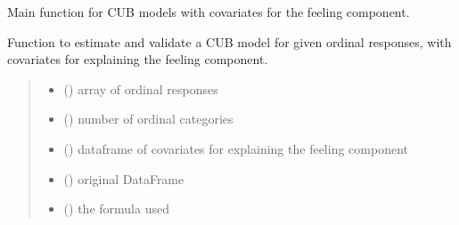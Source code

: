 \documentclass[letterpaper,10pt,english]{sphinxmanual}
\begin{document}

\begin{fulllineitems}
\label{\detokenize{cubmods:cubmods.cub_0w.mle}}
\pysigstartsignatures
{}
\pysigstopsignatures
\sphinxAtStartPar
Main function for CUB models with covariates for the feeling component.

\sphinxAtStartPar
Function to estimate and validate a CUB model for given ordinal responses, with covariates for
explaining the feeling component.
\begin{quote}\begin{description}
\begin{itemize}
\item {} 
\sphinxAtStartPar
{} () \textendash{} array of ordinal responses

\item {} 
\sphinxAtStartPar
{} () \textendash{} number of ordinal categories

\item {} 
\sphinxAtStartPar
{} () \textendash{} dataframe of covariates for explaining the feeling component

\item {} 
\sphinxAtStartPar
{} () \textendash{} original DataFrame

\item {} 
\sphinxAtStartPar
{} () \textendash{} the formula used


\end{itemize}
\end{description}
\end{quote}
\end{fulllineitems}
\end{document}
